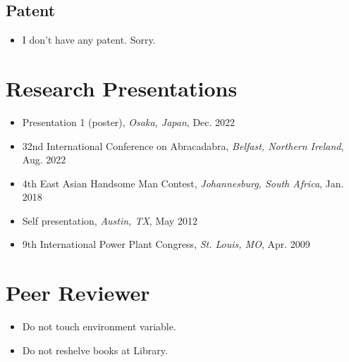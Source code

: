 \subsection*{Patent}
\vspace{-1.4mm}
\begin{itemize}
	\item I don't have any patent. Sorry.
\end{itemize}
\vspace{-3mm}

\section*{\textcolor{Burnt Orange}{Research Presentations}\hrulefill}
\vspace{-2.4mm}
\begin{itemize}
	\item Presentation 1 (poster), \textit{Osaka, Japan}, \hfill Dec. 2022
	\item 32nd International Conference on Abracadabra, \textit{Belfast, Northern Ireland}, \hfill Aug. 2022
	\item 4th East Asian Handsome Man Contest, \textit{Johannesburg, South Africa}, \hfill Jan. 2018
	\item Self presentation, \textit{\textit{Austin, TX}}, \hfill May 2012
	\item 9th International Power Plant Congress, \textit{St. Louis, MO}, \hfill Apr. 2009
\end{itemize}
\vspace{-3mm}

\section*{\textcolor{Burnt Orange}{Peer Reviewer}\hrulefill}
\vspace{-2.4mm}
\begin{itemize}
	\item Do not touch environment variable.
	\item Do not reshelve books at Library.
\end{itemize}
\vspace{-3mm}

